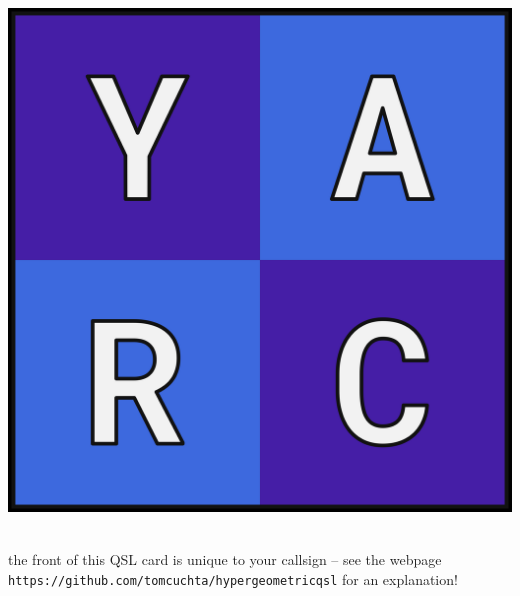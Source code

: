 \documentclass{article}
\begin{document}
\begin{minipage}{0.3\textwidth}
\includegraphics[scale=0.1]{yarc.png}\end{minipage}  \\
{\small *the front of this QSL card is unique to your callsign -- see the webpage \\ \texttt{https://github.com/tomcuchta/hypergeometricqsl} for an explanation!}
\end{document}
